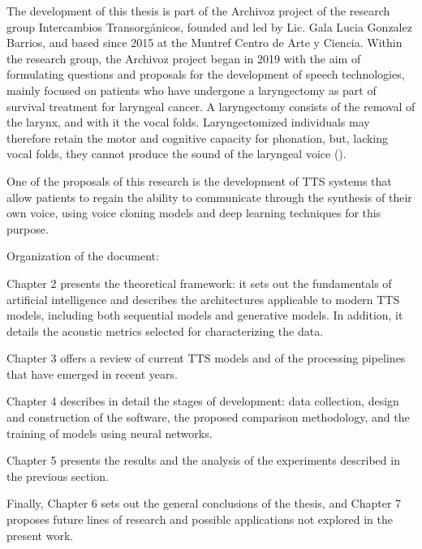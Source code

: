 The development of this thesis is part of the Archivoz project of the research group Intercambios Transorgánicos, founded and led by Lic. Gala Lucia Gonzalez Barrios, and based since 2015 at the Muntref Centro de Arte y Ciencia. Within the research group, the Archivoz project began in 2019 with the aim of formulating questions and proposals for the development of speech technologies, mainly focused on patients who have undergone a laryngectomy as part of survival treatment for laryngeal cancer. A laryngectomy consists of the removal of the larynx, and with it the vocal folds. Laryngectomized individuals may therefore retain the motor and cognitive capacity for phonation, but, lacking vocal folds, they cannot produce the sound of the laryngeal voice (\cite{gala}).

One of the proposals of this research is the development of TTS systems that allow patients to regain the ability to communicate through the synthesis of their own voice, using voice cloning models and deep learning techniques for this purpose.

Organization of the document:

Chapter 2 presents the theoretical framework: it sets out the fundamentals of artificial intelligence and describes the architectures applicable to modern TTS models, including both sequential models and generative models. In addition, it details the acoustic metrics selected for characterizing the data.

Chapter 3 offers a review of current TTS models and of the processing pipelines that have emerged in recent years.

Chapter 4 describes in detail the stages of development: data collection, design and construction of the software, the proposed comparison methodology, and the training of models using neural networks.

Chapter 5 presents the results and the analysis of the experiments described in the previous section.

Finally, Chapter 6 sets out the general conclusions of the thesis, and Chapter 7 proposes future lines of research and possible applications not explored in the present work.
